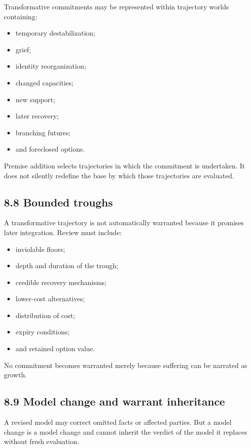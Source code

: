 \documentclass[
  11pt,
]{article}
\providecommand{\tightlist}{%
  \setlength{\itemsep}{0pt}\setlength{\parskip}{0pt}}
\begin{document}
Transformative commitments may be represented within trajectory worlds
containing:

\begin{itemize}
\tightlist
\item
  temporary destabilization;
\item
  grief;
\item
  identity reorganization;
\item
  changed capacities;
\item
  new support;
\item
  later recovery;
\item
  branching futures;
\item
  and foreclosed options.
\end{itemize}

Premise addition selects trajectories in which the commitment is
undertaken. It does not silently redefine the base by which those
trajectories are evaluated.

\subsection{8.8 Bounded troughs}\label{bounded-troughs}

A transformative trajectory is not automatically warranted because it
promises later integration. Review must include:

\begin{itemize}
\tightlist
\item
  inviolable floors;
\item
  depth and duration of the trough;
\item
  credible recovery mechanisms;
\item
  lower-cost alternatives;
\item
  distribution of cost;
\item
  expiry conditions;
\item
  and retained option value.
\end{itemize}

No commitment becomes warranted merely because suffering can be narrated
as growth.

\subsection{8.9 Model change and warrant
inheritance}\label{model-change-and-warrant-inheritance}

A revised model may correct omitted facts or affected parties. But a
model change is a model change and cannot inherit the verdict of the
model it replaces without fresh evaluation.
\end{document}
